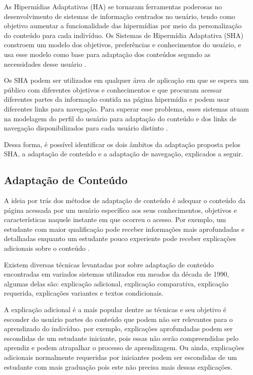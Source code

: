 As Hipermídias Adaptativas (HA) se tornaram ferramentas poderosas no desenvolvimento de sistemas de informação centrados no usuário, tendo como objetivo aumentar a funcionalidade das hipermídias por meio da personalização do conteúdo para cada indivíduo. Os Sistemas de Hipermídia Adaptativa (SHA) constroem um modelo dos objetivos, preferências e conhecimentos do usuário, e usa esse modelo como base para adaptação dos conteúdos segundo as necessidades desse usuário \cite{brusilovsky1996}.

Os SHA podem ser utilizados em qualquer área de aplicação em que se espera um público com diferentes objetivos e conhecimentos e que procuram acessar diferentes partes da informação contida na página hipermídia e podem usar diferentes links para navegação. Para superar esse problema, esses sistemas atuam na modelagem do perfil do usuário para adaptação do conteúdo e dos links de navegação disponibilizados para cada usuário distinto \cite{brusilovsky1996, brusilovsky2003, fragelli2010}.

Dessa forma, é possível identificar os dois âmbitos da adaptação proposta pelos SHA, a adaptação de conteúdo e a adaptação de navegação, explicados a seguir.

\subsection{Adaptação de Conteúdo}

A ideia por trás dos métodos de adaptação de conteúdo é adequar o conteúdo da página acessada por um usuário específico aos seus conhecimentos, objetivos e características naquele instante em que ocorreu o acesso.  Por exemplo, um estudante com maior qualificação pode receber informações mais aprofundadas e detalhadas enquanto um estudante pouco experiente pode receber explicações adicionais sobre o conteúdo \cite{brusilovsky1996}.

Existem diversas técnicas levantadas por  sobre adaptação de conteúdo encontradas em variados sistemas utilizados em meados da década de 1990, algumas delas são: explicação adicional, explicação comparativa, explicação requerida, explicações variantes e textos condicionais.

A explicação adicional é a mais popular dentre as técnicas e seu objetivo é esconder do usuário partes do conteúdo que podem não ser relevantes para o aprendizado do indivíduo. por exemplo, explicações aprofundadas podem ser escondidas de um estudante iniciante, pois essas não serão compreendidas pelo aprendiz e podem atrapalhar o processo de aprendizagem. Ou ainda, explicações adicionais normalmente requeridas por iniciantes podem ser escondidas de um estudante com mais graduação pois este não precisa mais dessas explicações.

